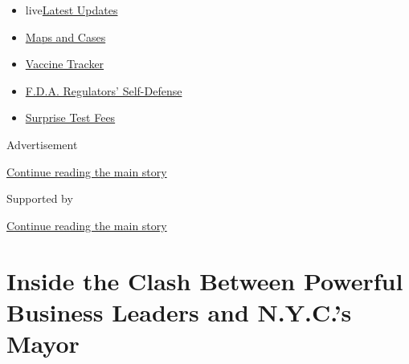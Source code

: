 \begin{itemize}
\tightlist
\item
  live\href{https://www.nytimes3xbfgragh.onion/2020/09/12/world/covid-19-coronavirus.html?name=styln-coronavirus-national\&region=TOP_BANNER\&block=storyline_menu_recirc\&action=click\&pgtype=Article\&impression_id=49c397b0-f52d-11ea-bb3a-a9cd15cea7c9\&variant=undefined}{Latest
  Updates}
\item
  \href{https://www.nytimes3xbfgragh.onion/interactive/2020/us/coronavirus-us-cases.html?name=styln-coronavirus-national\&region=TOP_BANNER\&block=storyline_menu_recirc\&action=click\&pgtype=Article\&impression_id=49c397b1-f52d-11ea-bb3a-a9cd15cea7c9\&variant=undefined}{Maps
  and Cases}
\item
  \href{https://www.nytimes3xbfgragh.onion/interactive/2020/science/coronavirus-vaccine-tracker.html?name=styln-coronavirus-national\&region=TOP_BANNER\&block=storyline_menu_recirc\&action=click\&pgtype=Article\&impression_id=49c397b2-f52d-11ea-bb3a-a9cd15cea7c9\&variant=undefined}{Vaccine
  Tracker}
\item
  \href{https://www.nytimes3xbfgragh.onion/2020/09/10/us/politics/fda-coronavirus-vaccine.html?name=styln-coronavirus-national\&region=TOP_BANNER\&block=storyline_menu_recirc\&action=click\&pgtype=Article\&impression_id=49c397b3-f52d-11ea-bb3a-a9cd15cea7c9\&variant=undefined}{F.D.A.
  Regulators' Self-Defense}
\item
  \href{https://www.nytimes3xbfgragh.onion/2020/09/09/upshot/coronavirus-surprise-test-fees.html?name=styln-coronavirus-national\&region=TOP_BANNER\&block=storyline_menu_recirc\&action=click\&pgtype=Article\&impression_id=49c397b4-f52d-11ea-bb3a-a9cd15cea7c9\&variant=undefined}{Surprise
  Test Fees}
\end{itemize}

Advertisement

\protect\hyperlink{after-top}{Continue reading the main story}

Supported by

\protect\hyperlink{after-sponsor}{Continue reading the main story}

\hypertarget{inside-the-clash-between-powerful-business-leaders-and-nycs-mayor}{%
\section{Inside the Clash Between Powerful Business Leaders and N.Y.C.'s
Mayor}\label{inside-the-clash-between-powerful-business-leaders-and-nycs-mayor}}

